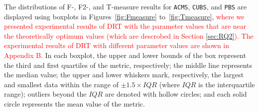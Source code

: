\documentclass[10pt,journal,compsoc]{IEEEtran}
\begin{document}
The distributions of F-, F2-, and T-measure results for \texttt{ACMS}, \texttt{CUBS}, and \texttt{PBS} are displayed using boxplots in
Figures~\ref{fig:Fmeasure} to~\ref{fig:Tmeasure}, \textcolor{red}{where we presented experimental results of DRT with the parameter values that are near the theoretically optimum values (which are descrobed in Section \ref{sec:RQ2}). The experimental results of DRT with different parameter values are shown in Appendix B.}
In each boxplot, the upper and lower bounds of the box represent the third and first quartiles of the metric, respectively;
the middle line represents the median value;
the upper and lower whiskers mark, respectively, the largest and smallest data within the range of $\pm 1.5 \times IQR$ (where $IQR$ is the interquartile range);
outliers beyond the  $IQR$ are denoted with hollow circles; and
each solid circle represents the mean value of the metric.
\end{document}

